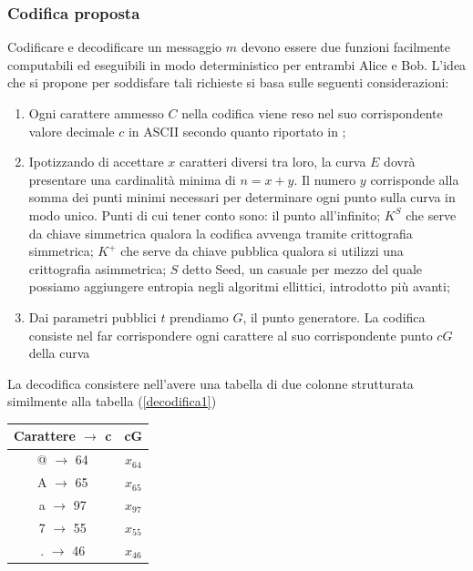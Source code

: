 \documentclass[a4paper,12pt]{tesiinfo}
\begin{document}
\subsubsection{Codifica proposta}
Codificare e decodificare un messaggio $m$ devono essere due funzioni facilmente computabili ed eseguibili in modo deterministico per entrambi Alice e Bob. L'idea che si propone per soddisfare tali richieste si basa sulle seguenti considerazioni:
\begin{enumerate}
 \item Ogni carattere ammesso $C$ nella codifica viene reso nel suo corrispondente valore decimale $c$ in ASCII secondo quanto riportato in \cite{ascii};
 \item Ipotizzando di accettare $x$ caratteri diversi tra loro, la curva $E$ dovr\`a presentare una cardinalit\`a minima di $n = x + y$. Il numero $y$ corrisponde alla somma dei punti minimi necessari per determinare ogni punto sulla curva in modo unico. Punti di cui tener conto sono: il punto all'infinito; $K^S$ che serve da chiave simmetrica qualora la codifica avvenga tramite crittografia simmetrica; $K^+$ che serve da chiave pubblica qualora si utilizzi una crittografia asimmetrica; $S$ detto Seed, un casuale per mezzo del quale possiamo aggiungere entropia negli algoritmi ellittici, introdotto pi\`u avanti;
 \item Dai parametri pubblici $t$ prendiamo $G$, il punto generatore. La codifica consiste nel far corrispondere ogni carattere al suo corrispondente punto $cG$ della curva
 \label{Pcodifica}
\end{enumerate}
La decodifica consistere nell'avere una tabella di due colonne strutturata similmente alla tabella (\ref{decodifica1})
\begin{center}
\begin{tabular}{ c c }
 Carattere $\to$ c & cG\\
 \hline
 @ $\to$ 64 & $x_{64}$\\
 A $\to$ 65 & $x_{65}$\\
 a $\to$ 97 & $x_{97}$\\
 7 $\to$ 55 & $x_{55}$\\
 . $\to$ 46 & $x_{46}$
 \label{decodifica1}
\end{tabular}
\end{center}
\end{document}
